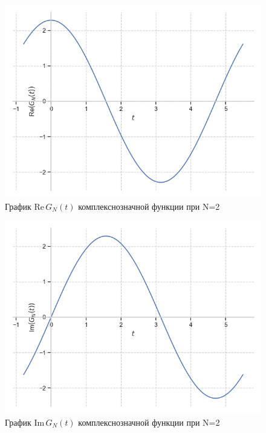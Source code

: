 \documentclass[a4paper, 16pt]{article}
\begin{document}
\begin{figure}[!htb]
    \centering
    \includegraphics[scale=0.8]{fourier_re_cfunc_n=2.png}
    \captionsetup{skip=0pt}
    \caption{График Re$\,G_N(t)$ комплекснозначной функции при N=2}
    \label{Рис:44}
\end{figure}
\begin{figure}[!htb]
    \centering
    \includegraphics[scale=0.8]{fourier_im_cfunc_n=2.png}
    \captionsetup{skip=0pt}
    \caption{График Im$\,G_N(t)$ комплекснозначной функции при N=2}
    \label{Рис:45}
\end{figure}
\newpage
\vspace*{10mm}
\end{document}
